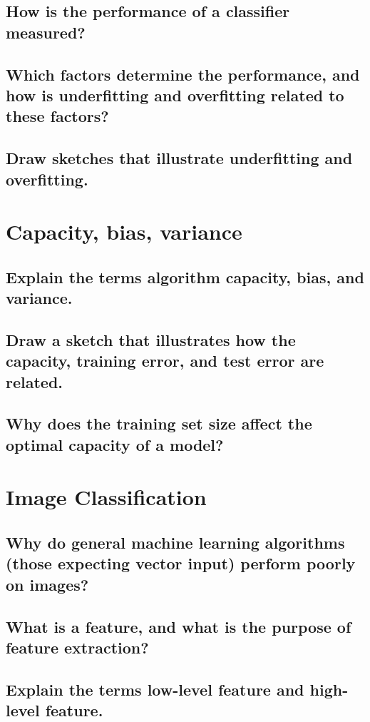 \subsection{How is the performance of a classifier measured?}
\subsection{Which factors determine the performance, and how is underfitting and overfitting related to these factors?}
\subsection{Draw sketches that illustrate underfitting and overfitting.}

\section{Capacity, bias, variance}
\subsection{Explain the terms algorithm capacity, bias, and variance.}
\subsection{Draw a sketch that illustrates how the capacity, training error, and test error are related.}
\subsection{Why does the training set size affect the optimal capacity of a model?}

\section{Image Classification}
\subsection{Why do general machine learning algorithms (those expecting vector input) perform poorly on images?}
\subsection{What is a feature, and what is the purpose of feature extraction?}
\subsection{Explain the terms low-level feature and high-level feature.}

